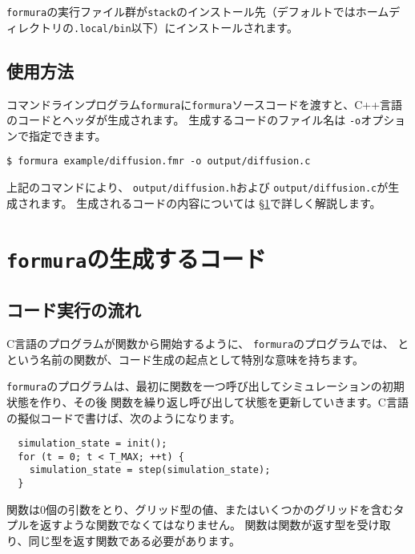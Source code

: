 \documentclass{jsarticle}
\newcommand{\formura}{{\texttt{formura}}}
\begin{document}
\formura の実行ファイル群が\verb`stack`のインストール先（デフォルトではホームディレクトリの\verb+.local/bin+以下）にインストールされます。


\subsection{使用方法}

コマンドラインプログラム\formura に\formura ソースコードを渡すと、C++言語のコードとヘッダが生成されます。
生成するコードのファイル名は
\verb`-o`オプションで指定できます。

\begin{verbatim}
$ formura example/diffusion.fmr -o output/diffusion.c
\end{verbatim}

上記のコマンドにより、
\verb`output/diffusion.h`および
\verb`output/diffusion.c`が生成されます。
生成されるコードの内容については
\S \ref{sec:formura-generated-code}で詳しく解説します。


\newpage

\section{\formura の生成するコード}\label{sec:formura-generated-code}

\subsection{コード実行の流れ}

C言語のプログラムが関数から開始するように、
\formura のプログラムでは、
と
という名前の関数が、コード生成の起点として特別な意味を持ちます。

\formura のプログラムは、最初に関数を一つ呼び出してシミュレーションの初期状態を作り、その後
関数を繰り返し呼び出して状態を更新していきます。C言語の擬似コードで書けば、次のようになります。

\begin{screen}
\begin{verbatim}
  simulation_state = init();
  for (t = 0; t < T_MAX; ++t) {
    simulation_state = step(simulation_state);
  }
\end{verbatim}
\end{screen}


関数は0個の引数をとり、グリッド型の値、またはいくつかのグリッドを含むタプルを返すような関数でなくてはなりません。
関数は関数が返す型を受け取り、同じ型を返す関数である必要があります。
\end{document}
